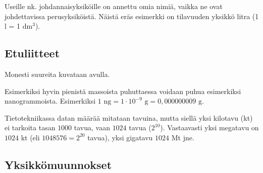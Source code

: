 Useille nk. johdannaisyksiköille on annettu omia nimiä, vaikka ne ovat johdettavissa perusyksiköistä.
Näistä eräs esimerkki on tilavuuden yksikkö litra (1 l = 1 dm$^3$).

\subsection*{Etuliitteet}

Monesti suureita kuvataan  avulla.


Esimerkiksi hyvin pienistä massoista puhuttaessa voidaan puhua esimerkiksi nanogrammoista.
Esimerkiksi $1 \textrm{ ng} = 1 \cdot 10^{-9} \textrm{ g} = 0,000000009 \textrm{ g} $.

Tietotekniikassa datan määrää mitataan tavuina, mutta siellä yksi kilotavu (kt) ei tarkoita tasan $1000$ tavua,  vaan $1024$ tavua ($2^{10}$).
Vastaavasti yksi megatavu on $1024$ kt (eli $1048576 = 2^{20}$ tavua), yksi gigatavu $1024$ Mt jne.

\subsection*{Yksikkömuunnokset}

